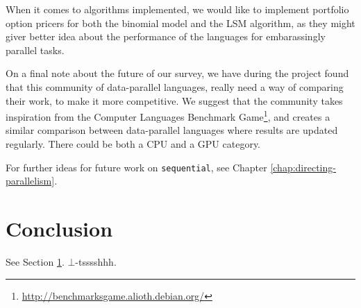 When it comes to algorithms implemented, we would like to implement
portfolio option pricers for both the binomial model and the LSM
algorithm, as they might giver better idea about the performance of
the languages for embarassingly parallel tasks.

On a final note about the future of our survey, we have during the
project found that this community of data-parallel languages, really
need a way of comparing their work, to make it more competitive. We
suggest that the community takes inspiration from the Computer
Languages Benchmark
Game\footnote{\url{http://benchmarksgame.alioth.debian.org/}}, and
creates a similar comparison between data-parallel languages where
results are updated regularly. There could be both a CPU and a GPU
category.

For further ideas for future work on \lstinline{sequential}, see
Chapter \ref{chap:directing-parallelism}.



\section{Conclusion}
\label{sec:conclusion}

See Section \ref{sec:conclusion}. $\bot$-tsssshhh.



